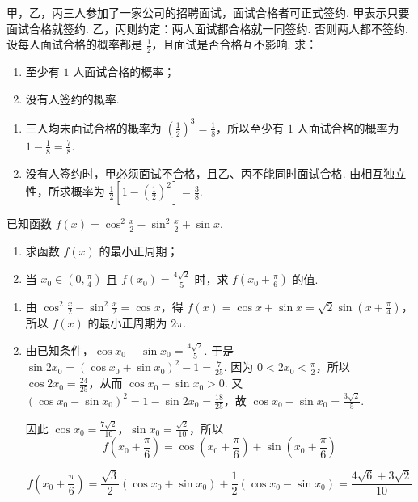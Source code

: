 \begin{problem}
甲，乙，丙三人参加了一家公司的招聘面试，面试合格者可正式签约. 甲表示只要面试合格就签约. 乙，丙则约定：两人面试都合格就一同签约. 否则两人都不签约. 设每人面试合格的概率都是 \(\frac{1}{2}\)，且面试是否合格互不影响. 求：
\begin{enumerate}
\item 至少有 \(1\) 人面试合格的概率；
\item 没有人签约的概率.
\end{enumerate}

\begin{solution}
\begin{enumerate}
\item 三人均未面试合格的概率为 \(\left(\frac{1}{2}\right)^3=\frac{1}{8}\)，所以至少有 \(1\) 人面试合格的概率为
\(1-\frac{1}{8}=\frac{7}{8}\).

\item 没有人签约时，甲必须面试不合格，且乙、丙不能同时面试合格. 由相互独立性，所求概率为
\(\frac{1}{2}\left[1-\left(\frac{1}{2}\right)^2\right]=\frac{3}{8}\).
\end{enumerate}
\end{solution}
\end{problem}

\begin{problem}
已知函数 \( f(x) = \cos^2 \frac{x}{2} - \sin^2 \frac{x}{2} + \sin x \).
\begin{enumerate}
\item 求函数 \( f(x) \) 的最小正周期；
\item 当 \(x_0 \in \left(0, \frac{\pi}{4}\right)\) 且 \(f(x_0) = \frac{4\sqrt{2}}{5}\) 时，求 \(f\left(x_0 + \frac{\pi}{6}\right)\) 的值.
\end{enumerate}

\begin{solution}
\begin{enumerate}
\item
由 \(\cos^2\frac{x}{2}-\sin^2\frac{x}{2}=\cos x\)，得
\(f(x)=\cos x+\sin x=\sqrt{2}\sin\left(x+\frac{\pi}{4}\right)\)，所以 \(f(x)\) 的最小正周期为 \(2\pi\).

\item
由已知条件，\(\cos x_0+\sin x_0=\frac{4\sqrt{2}}{5}\). 于是
\(\sin 2x_0=\left(\cos x_0+\sin x_0\right)^2-1=\frac{7}{25}\).
因为 \(0<2x_0<\frac{\pi}{2}\)，所以 \(\cos 2x_0=\frac{24}{25}\)，从而 \(\cos x_0-\sin x_0>0\). 又
\(\left(\cos x_0-\sin x_0\right)^2=1-\sin 2x_0=\frac{18}{25}\)，故 \(\cos x_0-\sin x_0=\frac{3\sqrt{2}}{5}\).

因此 \(\cos x_0=\frac{7\sqrt{2}}{10}\)，\(\sin x_0=\frac{\sqrt{2}}{10}\)，所以
\[
f\left(x_0+\frac{\pi}{6}\right)=\cos\left(x_0+\frac{\pi}{6}\right)+\sin\left(x_0+\frac{\pi}{6}\right)
\]

\[
f\left(x_0+\frac{\pi}{6}\right)=\frac{\sqrt{3}}{2}\left(\cos x_0+\sin x_0\right)+\frac{1}{2}\left(\cos x_0-\sin x_0\right)=\frac{4\sqrt{6}+3\sqrt{2}}{10}
\]
\end{enumerate}
\end{solution}
\end{problem}

